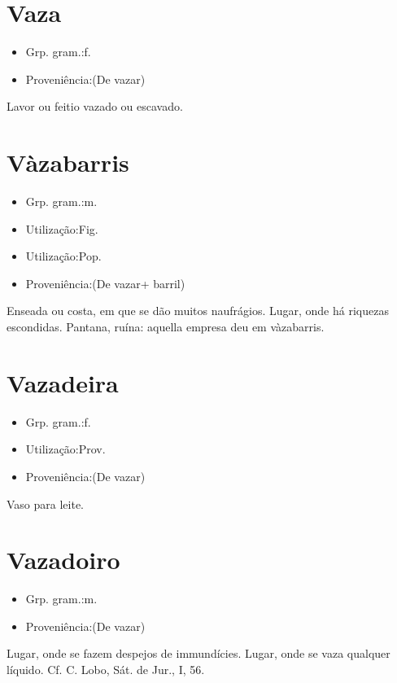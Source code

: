 \documentclass{article}
\begin{document}
\section{Vaza}
\begin{itemize}
\item {Grp. gram.:f.}
\end{itemize}
\begin{itemize}
\item {Proveniência:(De \textunderscore vazar\textunderscore )}
\end{itemize}
Lavor ou feitio vazado ou escavado.
\section{Vàzabarris}
\begin{itemize}
\item {Grp. gram.:m.}
\end{itemize}
\begin{itemize}
\item {Utilização:Fig.}
\end{itemize}
\begin{itemize}
\item {Utilização:Pop.}
\end{itemize}
\begin{itemize}
\item {Proveniência:(De \textunderscore vazar\textunderscore  + \textunderscore barril\textunderscore )}
\end{itemize}
Enseada ou costa, em que se dão muitos naufrágios.
Lugar, onde há riquezas escondidas.
Pantana, ruína: \textunderscore aquella empresa deu em vàzabarris\textunderscore .
\section{Vazadeira}
\begin{itemize}
\item {Grp. gram.:f.}
\end{itemize}
\begin{itemize}
\item {Utilização:Prov.}
\end{itemize}
\begin{itemize}
\item {Proveniência:(De \textunderscore vazar\textunderscore )}
\end{itemize}
Vaso para leite.
\section{Vazadoiro}
\begin{itemize}
\item {Grp. gram.:m.}
\end{itemize}
\begin{itemize}
\item {Proveniência:(De \textunderscore vazar\textunderscore )}
\end{itemize}
Lugar, onde se fazem despejos de immundícies.
Lugar, onde se vaza qualquer líquido. Cf. C. Lobo, \textunderscore Sát. de Jur.\textunderscore , I, 56.
\end{document}
